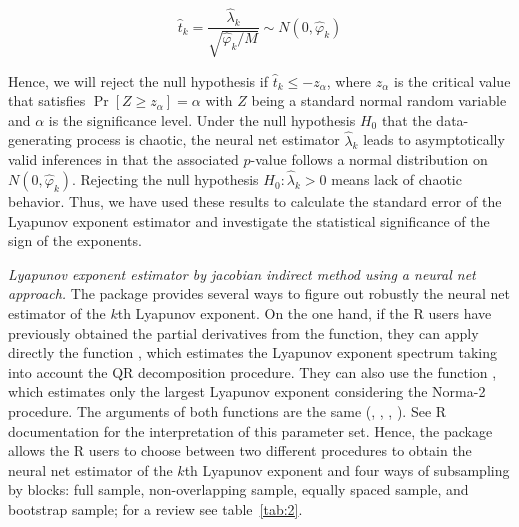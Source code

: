 \begin{equation}
{{\hat t}_k} = \frac{{{{\hat \lambda }_k}}}{{\sqrt {{{\hat \varphi }_k}/M} }}\sim N\left( {0,{{\hat \varphi }_k}} \right)
\label{eq:32}
\end{equation}

Hence, we will reject the null hypothesis if ${{\hat t}_k} \leqslant  - {z_\alpha }$, where ${{z_\alpha }}$ is the critical value that satisfies $\Pr \left[ {Z \geqslant {z_\alpha }} \right] = \alpha$ with $Z$ being a standard normal random variable and $\alpha$ is the significance level. Under the null hypothesis $H_0$ that the data-generating process is chaotic, the neural net estimator ${{\hat \lambda }_k}$ leads to asymptotically valid inferences in that the associated $p$-value follows a normal distribution on $N\left( {0,{{\hat \varphi }_k}} \right)$. Rejecting the null hypothesis ${H_0}:{{\hat \lambda }_k} > 0$ means lack of chaotic behavior. Thus, we have used these results to calculate the standard error of the Lyapunov exponent estimator and investigate the statistical significance of the sign of the exponents.

\textit{Lyapunov exponent estimator by jacobian indirect method using a neural net approach.} The  package provides several ways to figure out robustly the neural net estimator of the $k$th Lyapunov exponent. On the one hand, if the R users have previously obtained the partial derivatives from the  function, they can apply directly the function , which estimates the Lyapunov exponent spectrum taking into account the QR decomposition procedure. They can also use the function , which estimates only the largest Lyapunov exponent considering the Norma-2 procedure. The arguments of both functions are the same (, , , ). See R documentation for the interpretation of this parameter set. Hence, the  package allows the R users to choose between two different procedures to obtain the neural net estimator of the $k$th Lyapunov exponent and four ways of subsampling by blocks: full sample, non-overlapping sample, equally spaced sample, and bootstrap sample; for a review see table~\ref{tab:2}. 

